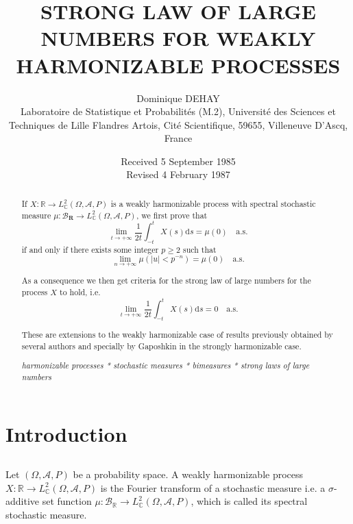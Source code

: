 \documentclass{article}
\title{STRONG LAW OF LARGE NUMBERS FOR WEAKLY HARMONIZABLE PROCESSES}
\author{Dominique DEHAY\\
Laboratoire de Statistique et Probabilités (M.2), Université des Sciences et Techniques de Lille Flandres Artois, Cité Scientifique, 59655, Villeneuve D'Ascq, France}
\date{Received 5 September 1985\\
Revised 4 February 1987}
\theoremstyle{definition}
\begin{document}
\maketitle

\begin{abstract}
If $X: \mathbb{R} \rightarrow L_{\mathbb{C}}^{2}(\Omega, \mathscr{A}, P)$ is a weakly harmonizable process with spectral stochastic measure $\mu: \mathscr{B}_{\mathbf{R}} \rightarrow L_{\mathbb{C}}^{2}(\Omega, \mathscr{A}, P)$, we first prove that
\begin{equation}\label{eq:1}
\lim_{t \rightarrow+\infty} \frac{1}{2 t} \int_{-t}^{t} X(s) \mathrm{d} s=\mu(0) \quad \text{a.s.}
\end{equation}
if and only if there exists some integer $p \geqslant 2$ such that
\begin{equation}\label{eq:2}
\lim_{n \rightarrow+\infty} \mu\left(|u|<p^{-n}\right)=\mu(0) \quad \text{a.s.}
\end{equation}

As a consequence we then get criteria for the strong law of large numbers for the process $X$ to hold, i.e.
\begin{equation}\label{eq:3}
\lim_{t \rightarrow+\infty} \frac{1}{2 t} \int_{-t}^{t} X(s) \mathrm{d} s=0 \quad \text{a.s.}
\end{equation}

These are extensions to the weakly harmonizable case of results previously obtained by several authors and specially by Gaposhkin in the strongly harmonizable case.

\noindent\textit{harmonizable processes * stochastic measures * bimeasures * strong laws of large numbers}
\end{abstract}

\section{Introduction}
\subsection{}

Let $(\Omega, \mathscr{A}, P)$ be a probability space. A weakly harmonizable process $X: \mathbb{R} \rightarrow L_{\mathbb{C}}^{2}(\Omega, \mathscr{A}, P)$ is the Fourier transform of a stochastic measure i.e. a $\sigma$-additive set function $\mu: \mathscr{B}_{\mathbb{R}} \rightarrow L_{\mathbb{C}}^{2}(\Omega, \mathscr{A}, P)$, which is called its spectral stochastic measure.
\end{document}
